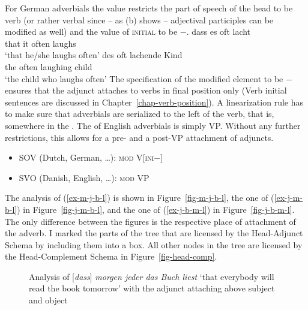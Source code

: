 For German adverbials the value restricts the part of speech of the head to be verb (or rather
verbal since -- as (b) shows -- adjectival participles can be modified as
well) and the value of \textsc{initial} to be $-$. 
\eal
\ex
\gll dass es oft lacht\\
     that it often laughs\\\german
\glt `that he/she laughs often'
\ex 
\gll des oft lachende Kind\\
     the often laughing child\\
\glt `the child who laughs often'
\zl
The specification of the modified element to be \initial$-$ ensures that the adjunct attaches to
verbs in final position only (Verb initial sentences are discussed in
Chapter~\ref{chap-verb-position}). A linearization rule has to make sure that adverbials are
serialized to the left of the verb, that is, somewhere in the \mf. The \modv of English adverbials
is simply VP. Without any further restrictions, this allows for a pre- and a post-VP attachment of
adjuncts.
\begin{itemize}
\item SOV (Dutch, German, \ldots): \textsc{mod} V[\textsc{ini}$-$]
\item SVO (Danish, English, \ldots): \textsc{mod} VP
\end{itemize}

The analysis of (\ref{ex-m-j-b-l}) is shown in Figure~\vref{fig-m-j-b-l}, the one of
(\ref{ex-j-m-b-l}) in Figure~\vref{fig-j-m-b-l}, and the one of (\ref{ex-j-b-m-l}) in
Figure~\vref{fig-j-b-m-l}. The only difference between the figures is the respective place of
attachment of the adverb. I marked the parts of the tree that are licensed by the Head-Adjunct
Schema by including them into a box. All other nodes in the tree are licensed by the Head-Complement
Schema in Figure~\ref{fig-head-comp}.


\begin{figure}

\caption{\label{fig-m-j-b-l}Analysis of [\emph{dass}] \emph{morgen jeder das Buch liest} `that everybody will read the
  book tomorrow' with the adjunct attaching above subject and object}
\end{figure}


